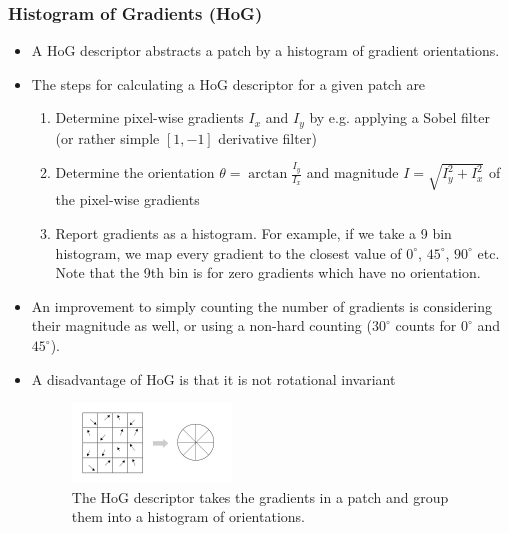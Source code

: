 \subsubsection{Histogram of Gradients (HoG)}
\begin{itemize}
	\item A HoG descriptor abstracts a patch by a histogram of gradient orientations. \item The steps for calculating a HoG descriptor for a given patch are
	\begin{enumerate}
		\item Determine pixel-wise gradients $I_x$ and $I_y$ by e.g. applying a Sobel filter (or rather simple $[1,-1]$ derivative filter)
		\item Determine the orientation $\theta = \arctan \frac{I_y}{I_x}$ and magnitude $I=\sqrt{I_y^2 + I_x^2}$ of the pixel-wise gradients
		\item Report gradients as a histogram. For example, if we take a 9 bin histogram, we map every gradient to the closest value of $0^{\circ}$, $45^{\circ}$, $90^{\circ}$ etc. Note that the 9th bin is for zero gradients which have no orientation.
	\end{enumerate}
	\item An improvement to simply counting the number of gradients is considering their magnitude as well, or using a non-hard counting ($30^{\circ}$ counts for $0^{\circ}$ and $45^{\circ}$).
	\item A disadvantage of HoG is that it is not rotational invariant
	\begin{figure}[ht!]
		\centering
		\includegraphics[width=0.4\textwidth]{figures/cv_image_processing_HoG.jpg}
		\caption{The HoG descriptor takes the gradients in a patch and group them into a histogram of orientations.}
		\label{fig:descriptor_HoG}
	\end{figure}
\end{itemize}
